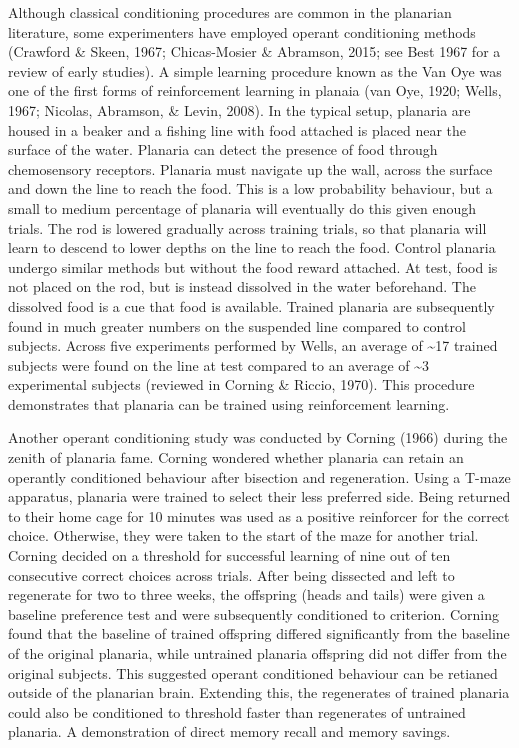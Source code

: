 \documentclass[
  letterpaper,
  DIV=11,
  numbers=noendperiod,
  oneside]{scrartcl}
\begin{document}
Although classical conditioning procedures are common in the planarian
literature, some experimenters have employed operant conditioning
methods (Crawford \& Skeen, 1967; Chicas-Mosier \& Abramson, 2015; see
Best 1967 for a review of early studies). A simple learning procedure
known as the Van Oye was one of the first forms of reinforcement
learning in planaia (van Oye, 1920; Wells, 1967; Nicolas, Abramson, \&
Levin, 2008). In the typical setup, planaria are housed in a beaker and
a fishing line with food attached is placed near the surface of the
water. Planaria can detect the presence of food through chemosensory
receptors. Planaria must navigate up the wall, across the surface and
down the line to reach the food. This is a low probability behaviour,
but a small to medium percentage of planaria will eventually do this
given enough trials. The rod is lowered gradually across training
trials, so that planaria will learn to descend to lower depths on the
line to reach the food. Control planaria undergo similar methods but
without the food reward attached. At test, food is not placed on the
rod, but is instead dissolved in the water beforehand. The dissolved
food is a cue that food is available. Trained planaria are subsequently
found in much greater numbers on the suspended line compared to control
subjects. Across five experiments performed by Wells, an average of
\textasciitilde17 trained subjects were found on the line at test
compared to an average of \textasciitilde3 experimental subjects
(reviewed in Corning \& Riccio, 1970). This procedure demonstrates that
planaria can be trained using reinforcement learning.

Another operant conditioning study was conducted by Corning (1966)
during the zenith of planaria fame. Corning wondered whether planaria
can retain an operantly conditioned behaviour after bisection and
regeneration. Using a T-maze apparatus, planaria were trained to select
their less preferred side. Being returned to their home cage for 10
minutes was used as a positive reinforcer for the correct choice.
Otherwise, they were taken to the start of the maze for another trial.
Corning decided on a threshold for successful learning of nine out of
ten consecutive correct choices across trials. After being dissected and
left to regenerate for two to three weeks, the offspring (heads and
tails) were given a baseline preference test and were subsequently
conditioned to criterion. Corning found that the baseline of trained
offspring differed significantly from the baseline of the original
planaria, while untrained planaria offspring did not differ from the
original subjects. This suggested operant conditioned behaviour can be
retianed outside of the planarian brain. Extending this, the regenerates
of trained planaria could also be conditioned to threshold faster than
regenerates of untrained planaria. A demonstration of direct memory
recall and memory savings.
\end{document}
